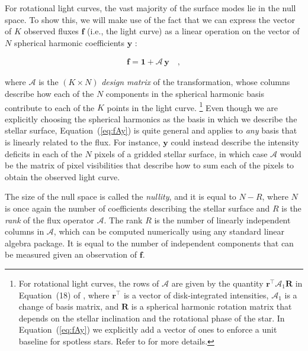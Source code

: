 \documentclass[modern,linenumbers]{aastex62}
\begin{document}
For rotational light curves,
the vast majority of the surface modes lie in the null
space. To show this, we will make use of the fact that we can express
the vector of $K$ observed fluxes $\mathbf{f}$ (i.e., the light curve)
as a linear operation on the vector of $N$
spherical harmonic coefficients $\mathbf{y}$ \citep{Luger2019}:
%
\begin{linenomath}\begin{align}
        \label{eq:fAy}
        \mathbf{f} = \mathbf{1} + \pmb{\mathcal{A}} \, \mathbf{y}
        \quad,
    \end{align}\end{linenomath}
%
where $\pmb{\mathcal{A}}$ is the $(K \times N)$ \emph{design matrix} of the transformation, whose columns
describe how each of the $N$ components in the spherical harmonic basis contribute
to each of the $K$ points in the light curve.%
\footnote{%
    For rotational light curves, the rows of $\pmb{\mathcal{A}}$ are given by the
    quantity $\mathbf{r}^\top \pmb{\mathcal{A}}_1 \mathbf{R}$ in Equation~(18) of
    \citet{Luger2019}, where $\mathbf{r}^\top$ is a vector of disk-integrated
    intensities, $\pmb{\mathcal{A}}_1$ is a change of basis matrix, and $\mathbf{R}$
    is a spherical harmonic rotation matrix that depends on the stellar inclination
    and the rotational phase of the star. In Equation~(\ref{eq:fAy}) we explicitly
    add a vector of ones to enforce a unit baseline for spotless stars.
    Refer to \citet{Luger2019} for more details.
}
%
Even though we are explicitly choosing the spherical harmonics as the basis in which
we describe the stellar surface, Equation~(\ref{eq:fAy}) is quite general and applies to
\emph{any} basis that is linearly related to the flux. For instance, $\mathbf{y}$
could instead describe the intensity deficits in each of the $N$ pixels of a gridded stellar
surface, in which case $\pmb{\mathcal{A}}$ would be the matrix of pixel visibilities that describe
how to sum each of the pixels to obtain the observed light curve.

The size of the null space is called the \emph{nullity}, and it is equal to
$N - R$, where $N$ is once again the number of coefficients describing the
stellar surface and $R$ is the \emph{rank} of the flux operator $\pmb{\mathcal{A}}$.
The rank $R$ is the number of linearly independent columns in $\pmb{\mathcal{A}}$, which
can be computed numerically using any standard linear algebra package. It is equal
to the number of independent components that can be measured given
an observation of $\mathbf{f}$.
\end{document}
